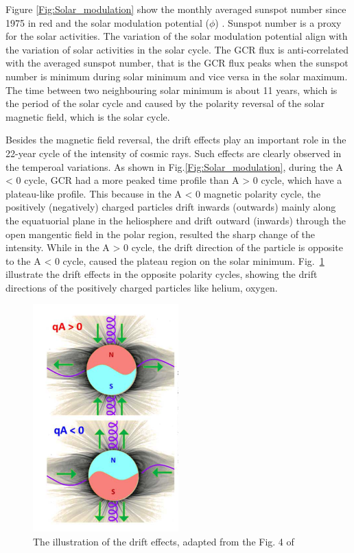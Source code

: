 Figure \ref{Fig:Solar_modulation} show the monthly averaged sunspot number since 1975 in red and the solar modulation potential ($\phi$) \cite{Usoskin 2011}.
Sunspot number is a proxy for the solar activities. The variation of the solar modulation potential align with the variation of solar activities in the solar cycle.
The GCR flux is anti-correlated with the averaged sunspot number, that is the GCR flux peaks when the sunspot number is minimum during solar minimum and vice versa in the solar maximum.
The time between two neighbouring solar minimum is about 11 years, which is the period of the solar cycle and caused by the polarity reversal of the solar magnetic field, which is the solar cycle.

Besides the magnetic field reversal, the drift effects play an important role in the 22-year cycle of the intensity of cosmic rays. Such effects are clearly observed in the temperoal variations.
As shown in Fig.\ref{Fig:Solar_modulation}, during the A < 0 cycle, GCR had a more peaked time profile than A > 0 cycle, which have a plateau-like profile. 
This because in the A < 0 magnetic polarity cycle, the positively (negatively) charged particles drift inwards (outwards) mainly along the equatuorial plane in the heliosphere and drift outward (inwards) through the open mangentic field in the polar region, resulted the sharp change of the intensity. While in the A > 0 cycle, the drift direction of the particle is opposite to the A < 0 cycle, caused the plateau region on the solar minimum. Fig.~\ref{Fig:drift_effect} illustrate the drift effects in the opposite polarity cycles, showing the drift directions of the positively charged particles like helium, oxygen.

\begin{figure}
	\centering
	\includegraphics[width = 0.5\textwidth]{images/drift_effect.png}
	\caption{The illustration of the drift effects, adapted from the Fig. 4 of \citep{Rankim 2020?}}
	\label{Fig:drift_effect}	
\end{figure}

